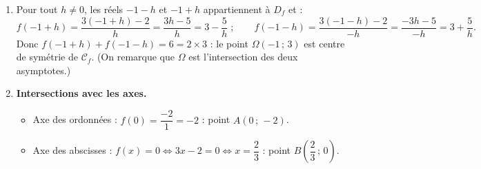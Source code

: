 \documentclass[11pt]{article}
\newcommand{\cle}[1]{{\popxbold\color{popdark}#1}}
\begin{document}
\begin{corrige}
\begin{enumerate}
\begin{attention}
\end{attention}
\item Pour tout $h\neq 0$, les réels $-1-h$ et $-1+h$ appartiennent à $D_f$ et :
\[ f(-1+h)=\frac{3(-1+h)-2}{h}=\frac{3h-5}{h}=3-\frac{5}{h}\;;\qquad f(-1-h)=\frac{3(-1-h)-2}{-h}=\frac{-3h-5}{-h}=3+\frac{5}{h}. \]
Donc $f(-1+h)+f(-1-h)=6=2\times 3$ : le point $\boxed{\Omega(-1\,;\,3)}$ est \cle{centre de symétrie} de $\mathscr{C}_f$. (On remarque que $\Omega$ est l'intersection des deux asymptotes.)
\item \textbf{Intersections avec les axes.}
\begin{itemize}
\item Axe des ordonnées : $f(0)=\dfrac{-2}{1}=-2$ : point $A(0\,;\,-2)$.
\item Axe des abscisses : $f(x)=0\iff 3x-2=0\iff x=\dfrac{2}{3}$ : point $B\left(\dfrac{2}{3}\,;\,0\right)$.
\end{itemize}
\end{enumerate}


\end{corrige}
\end{document}
